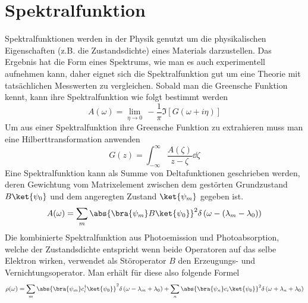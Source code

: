 \section{Spektralfunktion}
Spektralfunktionen werden in der Physik genutzt um die physikalischen Eigenschaften (z.B. die Zustandsdichte) eines Materials darzustellen.\cite{Lin} Das Ergebnis hat die Form eines Spektrums, wie man es auch experimentell aufnehmen kann, daher eignet sich die Spektralfunktion gut um eine Theorie mit tatsächlichen Messwerten zu vergleichen.
Sobald man die Greensche Funktion kennt, kann ihre Spektralfunktion wie folgt bestimmt werden
\begin{equation}\label{G2A}
A(\omega)= \lim\limits_{\eta \rightarrow 0}\,-\frac{1}{\pi}\Im\left[ G(\omega+i\eta)\right] 
\end{equation}
Um aus einer Spektralfunktion ihre Greensche Funktion zu extrahieren muss man eine Hilberttransformation anwenden
\begin{equation}\label{A2G}
G(z) = \int_{-\infty}^{\infty}\frac{A(\zeta)}{z- \zeta}\dd{\zeta}
\end{equation}
\cite{Rickayzen,schoett2014}
Eine Spektralfunktion kann als Summe von Deltafunktionen geschrieben werden, deren Gewichtung vom Matrixelement zwischen dem gestörten Grundzustand $ B\ket{\psi_0} $ und dem angeregten Zustand $ \ket{\psi_m} $ gegeben ist.
\begin{equation}\label{deltasum}
A(\omega) =\sum_{m}\abs{\bra{\psi_m}B\ket{\psi_0}}^2\delta\left( \omega-(\lambda_m-\lambda_0)\right) 
\end{equation}
Die kombinierte Spektralfunktion aus Photoemission und Photoabsorption, welche der Zustandsdichte entspricht wenn beide Operatoren auf das selbe Elektron wirken, verwendet als Störoperator $ B $ den Erzeugungs- und Vernichtungsoperator. Man erhält für diese also folgende Formel
\begin{equation}\label{rho}
\rho(\omega) = \sum_{m}\abs{\bra{\psi_m}c^\dagger_i\ket{\psi_0}}^2\delta\left( \omega -\lambda_m +\lambda_0\right) + \sum_{n}\abs{\bra{\psi_n}c_i\ket{\psi_0}}^2\delta\left( \omega +\lambda_n + \lambda_0\right)
\end{equation}




